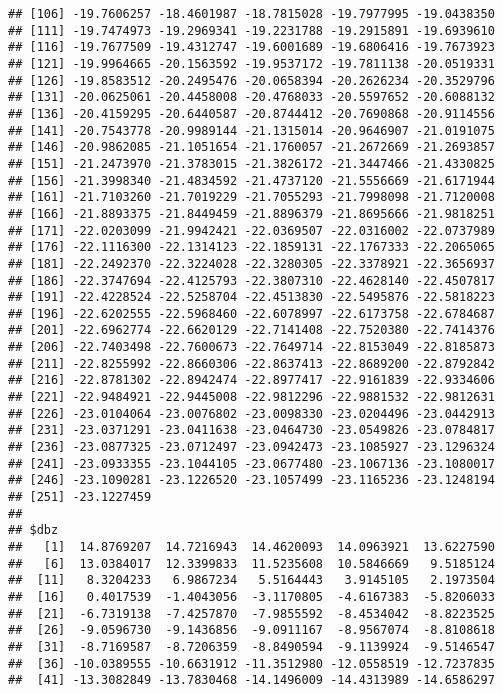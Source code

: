 \documentclass[]{article}
\begin{document}
\begin{verbatim}
## [106] -19.7606257 -18.4601987 -18.7815028 -19.7977995 -19.0438350
## [111] -19.7474973 -19.2969341 -19.2231788 -19.2915891 -19.6939610
## [116] -19.7677509 -19.4312747 -19.6001689 -19.6806416 -19.7673923
## [121] -19.9964665 -20.1563592 -19.9537172 -19.7811138 -20.0519331
## [126] -19.8583512 -20.2495476 -20.0658394 -20.2626234 -20.3529796
## [131] -20.0625061 -20.4458008 -20.4768033 -20.5597652 -20.6088132
## [136] -20.4159295 -20.6440587 -20.8744412 -20.7690868 -20.9114556
## [141] -20.7543778 -20.9989144 -21.1315014 -20.9646907 -21.0191075
## [146] -20.9862085 -21.1051654 -21.1760057 -21.2672669 -21.2693857
## [151] -21.2473970 -21.3783015 -21.3826172 -21.3447466 -21.4330825
## [156] -21.3998340 -21.4834592 -21.4737120 -21.5556669 -21.6171944
## [161] -21.7103260 -21.7019229 -21.7055293 -21.7998098 -21.7120008
## [166] -21.8893375 -21.8449459 -21.8896379 -21.8695666 -21.9818251
## [171] -22.0203099 -21.9942421 -22.0369507 -22.0316002 -22.0737989
## [176] -22.1116300 -22.1314123 -22.1859131 -22.1767333 -22.2065065
## [181] -22.2492370 -22.3224028 -22.3280305 -22.3378921 -22.3656937
## [186] -22.3747694 -22.4125793 -22.3807310 -22.4628140 -22.4507817
## [191] -22.4228524 -22.5258704 -22.4513830 -22.5495876 -22.5818223
## [196] -22.6202555 -22.5968460 -22.6078997 -22.6173758 -22.6784687
## [201] -22.6962774 -22.6620129 -22.7141408 -22.7520380 -22.7414376
## [206] -22.7403498 -22.7600673 -22.7649714 -22.8153049 -22.8185873
## [211] -22.8255992 -22.8660306 -22.8637413 -22.8689200 -22.8792842
## [216] -22.8781302 -22.8942474 -22.8977417 -22.9161839 -22.9334606
## [221] -22.9484921 -22.9445008 -22.9812296 -22.9881532 -22.9812631
## [226] -23.0104064 -23.0076802 -23.0098330 -23.0204496 -23.0442913
## [231] -23.0371291 -23.0411638 -23.0464730 -23.0549826 -23.0784817
## [236] -23.0877325 -23.0712497 -23.0942473 -23.1085927 -23.1296324
## [241] -23.0933355 -23.1044105 -23.0677480 -23.1067136 -23.1080017
## [246] -23.1090281 -23.1226520 -23.1057499 -23.1165236 -23.1248194
## [251] -23.1227459
## 
## $dbz
##   [1]  14.8769207  14.7216943  14.4620093  14.0963921  13.6227590
##   [6]  13.0384017  12.3399833  11.5235608  10.5846669   9.5185124
##  [11]   8.3204233   6.9867234   5.5164443   3.9145105   2.1973504
##  [16]   0.4017539  -1.4043056  -3.1170805  -4.6167383  -5.8206033
##  [21]  -6.7319138  -7.4257870  -7.9855592  -8.4534042  -8.8223525
##  [26]  -9.0596730  -9.1436856  -9.0911167  -8.9567074  -8.8108618
##  [31]  -8.7169587  -8.7206359  -8.8490594  -9.1139924  -9.5146547
##  [36] -10.0389555 -10.6631912 -11.3512980 -12.0558519 -12.7237835
##  [41] -13.3082849 -13.7830468 -14.1496009 -14.4313989 -14.6586297

\end{verbatim}
\end{document}
